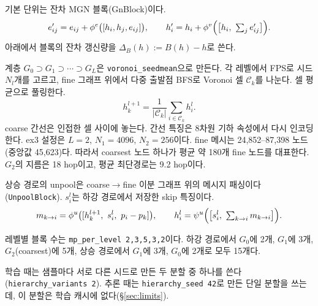 \documentclass[11pt]{article}
\newcommand{\code}[1]{\texttt{#1}}
\begin{document}
기본 단위는 잔차 MGN 블록(GnBlock)이다.
\begin{equation}
  e_{ij}' = e_{ij} + \phi^e\bigl([h_i, h_j, e_{ij}]\bigr),\qquad
  h_i' = h_i + \phi^v\Bigl(\bigl[h_i,\ \textstyle\sum_{j} e_{ij}'\bigr]\Bigr).
  \label{eq:gnblock}
\end{equation}
아래에서 블록의 잔차 갱신량을 $\Delta_B(h) := B(h) - h$로 쓴다.

계층 $G_0\supset G_1\supset\cdots\supset G_L$은 \code{voronoi\_seedmean}으로
만든다. 각 레벨에서 FPS로 시드 $N_l$개를 고르고, fine 그래프 위에서
다중 출발점 BFS로 Voronoi 셀 $\mathcal{C}_k$를 나눈다. 셀 평균으로 풀링한다.
\begin{equation}
  h^{l+1}_k = \frac{1}{|\mathcal{C}_k|}\sum_{i\in\mathcal{C}_k} h^l_i .
\end{equation}
coarse 간선은 인접한 셀 사이에 놓는다. 간선 특징은 8차원 기하 속성에서 다시
인코딩한다. ex3 설정은 $L=2$, $N_1=4096$, $N_2=256$이다. fine 메시는
24,852--87,398 노드(중앙값 45,623)다. 따라서 coarsest 노드 하나가 평균
약 180개 fine 노드를 대표한다. $G_2$의 지름은 18 hop이고, 평균 최단경로는
9.2 hop이다.

상승 경로의 unpool은 coarse$\to$fine 이분 그래프 위의 메시지 패싱이다
(\code{UnpoolBlock}). $s^l_i$는 하강 경로에서 저장한 skip 특징이다.
\begin{equation}
  m_{k\to i} = \phi^u\bigl([h^{l+1}_k,\ s^l_i,\ p_i - p_k]\bigr),\qquad
  h^l_i = \psi^u\Bigl(\bigl[s^l_i,\ \textstyle\sum_{k\to i} m_{k\to i}\bigr]\Bigr).
\end{equation}

레벨별 블록 수는 \code{mp\_per\_level}\ \code{2,3,5,3,2}이다. 하강 경로에서 $G_0$에
2개, $G_1$에 3개, $G_2$(coarsest)에 5개, 상승 경로에서 $G_1$에 3개, $G_0$에
2개로 모두 15개다.

학습 때는 샘플마다 서로 다른 시드로 만든 두 분할 중 하나를 쓴다
(\code{hierarchy\_variants 2}). 추론 때는 \code{hierarchy\_seed 42}로 만든 단일
분할을 쓰는데, 이 분할은 학습 캐시에 없다(\S\ref{sec:limits}).
\end{document}
